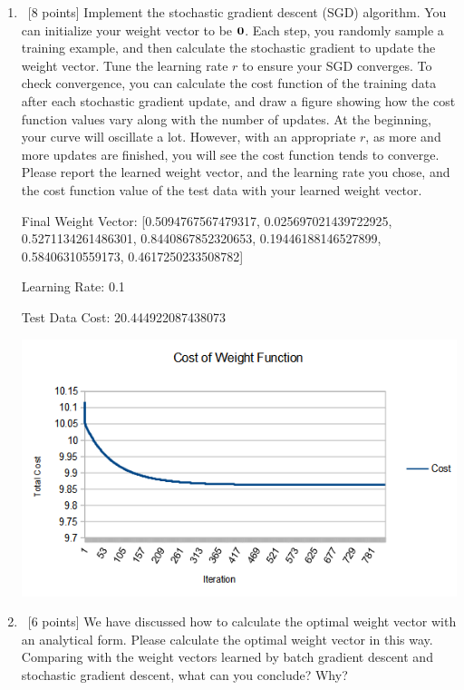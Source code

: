 \documentclass[12pt, fullpage,letterpaper]{article}
\begin{document}
\begin{enumerate}
\begin{enumerate}
		\item~[8 points] Implement the stochastic gradient descent (SGD) algorithm. You can initialize your weight vector to be ${\bf 0}$. Each step, you randomly sample a training example, and then calculate the stochastic gradient to update the weight vector.  Tune the learning rate $r$ to ensure your SGD converges. To check convergence, you can calculate the cost function of the training data after each stochastic gradient update, and draw a figure showing how the cost function values vary along with the number of updates. At the beginning, your curve will oscillate a lot. However, with an appropriate $r$, as more and more updates are finished, you will see the cost function tends to converge. Please report the learned weight vector, and the learning rate you chose, and the cost function value of the test data with your learned weight vector.
				
		\bigskip
		
		Final Weight Vector: [0.5094767567479317, 0.025697021439722925, 0.5271134261486301, 0.8440867852320653, 0.19446188146527899, 0.58406310559173, 0.4617250233508782]
		
		Learning Rate: 0.1
		
		Test Data Cost: 20.444922087438073
		
		\begin{center}
			\includegraphics[scale=0.8]{stoch_graph}
		\end{center}
	
		\item~[6 points] We have discussed how to  calculate the optimal weight vector with an analytical form. Please calculate the optimal weight vector in this way. Comparing with the  weight vectors learned by batch gradient descent and stochastic gradient descent, what can you conclude? Why?
		

\end{enumerate}
\end{enumerate}
\end{document}
